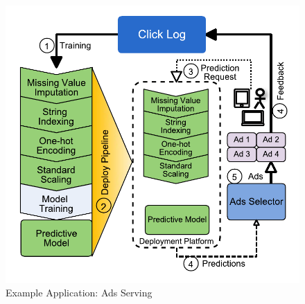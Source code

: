 \begin{figure}[h!]
\centering
\includegraphics[width=\columnwidth]{../images/motivational-example-vertical.pdf}
\caption{Example Application: Ads Serving}
\label{fig:motivational-example}
\end{figure}

